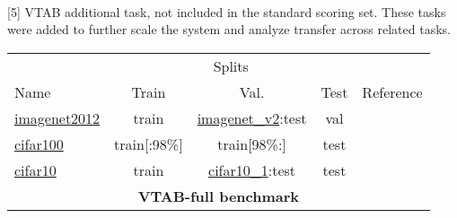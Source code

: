 \documentclass{article} \usepackage{iclr2023_conference,times}
\begin{document}
\begin{table}[h]
{\\\hspace{\textwidth}
[5] VTAB additional task, not included in the standard scoring set. These tasks were added to further scale the system and analyze transfer across related tasks.
}
\label{table:datasets}
\centering
\setlength\tabcolsep{3pt}
\begin{tabular}{lcccc}
    \toprule
& \multicolumn{3}{c}{Splits}                   \\
\cmidrule(r){2-4}
    Name & Train & Val. & Test  & Reference\\
    \midrule
    \midrule

\href{https://www.tensorflow.org/datasets/catalog/imagenet2012}{imagenet2012}
& train & {\tiny \href{https://www.tensorflow.org/datasets/catalog/imagenet_v2}{imagenet\_v2}:}test & val
& \citep{Russakovsky2015ImageNetLS}
\\
\href{https://www.tensorflow.org/datasets/catalog/cifar100}{cifar100}
& train[:98\%] & train[98\%:] & test
& \citep{Krizhevsky2009LearningML}
\\
\href{https://www.tensorflow.org/datasets/catalog/cifar10}{cifar10}
& train & {\tiny \href{https://www.tensorflow.org/datasets/catalog/cifar10_1}{cifar10\_1}:}test & test
& \citep{Krizhevsky2009LearningML}
\\

\midrule
\multicolumn{5}{c}{\textbf{VTAB-full benchmark}} \\


\end{tabular}
\end{table}
\end{document}
